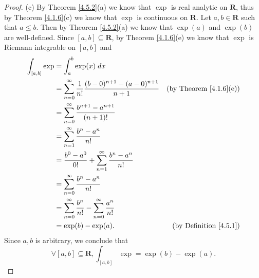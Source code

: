 \begin{proof}{(c)}
    By Theorem \ref{4.5.2}(a) we know that \(\exp\) is real analytic on \(\mathbf{R}\), thus by Theorem \ref{4.1.6}(c) we know that \(\exp\) is continuous on \(\mathbf{R}\).
    Let \(a, b \in \mathbf{R}\) such that \(a \leq b\).
    Then by Theorem \ref{4.5.2}(a) we know that \(\exp(a)\) and \(\exp(b)\) are well-defined.
    Since \([a, b] \subseteq \mathbf{R}\), by Theorem \ref{4.1.6}(e) we know that \(\exp\) is Riemann integrable on \([a, b]\) and
    \begin{align*}
        \int_{[a, b]} \exp & = \int_a^b \exp(x) \; dx                                                                                                \\
                           & = \sum_{n = 0}^\infty \frac{1}{n!} \frac{(b - 0)^{n + 1} - (a - 0)^{n + 1}}{n + 1} & \text{(by Theorem \ref{4.1.6}(e))} \\
                           & = \sum_{n = 0}^\infty \frac{b^{n + 1} - a^{n + 1}}{(n + 1)!}                                                            \\
                           & = \sum_{n = 1}^\infty \frac{b^n - a^n}{n!}                                                                              \\
                           & = \frac{b^0 - a^0}{0!} + \sum_{n = 1}^\infty \frac{b^n - a^n}{n!}                                                       \\
                           & = \sum_{n = 0}^\infty \frac{b^n - a^n}{n!}                                                                              \\
                           & = \sum_{n = 0}^\infty \frac{b^n}{n!} - \sum_{n = 0}^\infty \frac{a^n}{n!}                                               \\
                           & = \exp(b) - \exp(a).                                                               & \text{(by Definition \ref{4.5.1})}
    \end{align*}
    Since \(a, b\) is arbitrary, we conclude that
    \[
        \forall [a, b] \subseteq \mathbf{R}, \int_{[a, b]} \exp = \exp(b) - \exp(a).
    \]
\end{proof}

